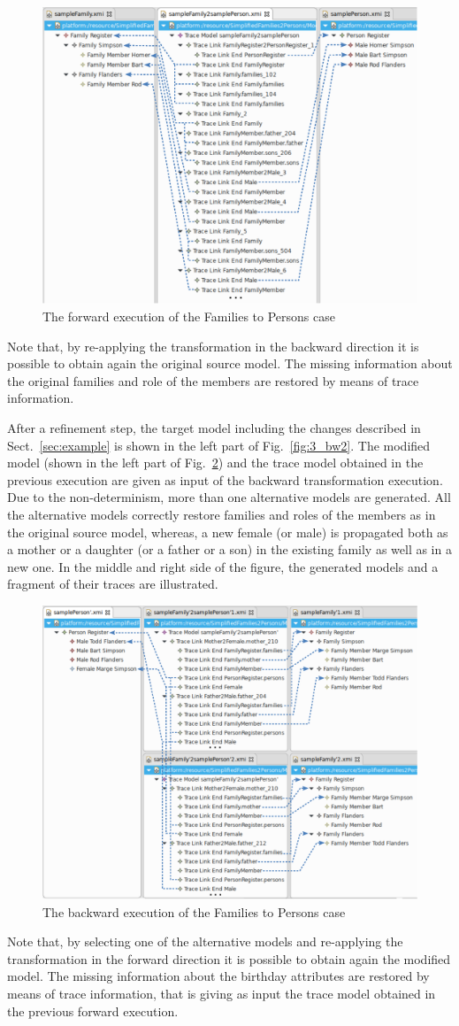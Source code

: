\begin{figure}[h]
	\center
	\includegraphics[width=.5\textwidth]{diagrams/solutions/jtl_fw}
	\caption{The forward execution of the Families to Persons case}
	\label{fig:jtl_fw}
\end{figure}


Note that, by re-applying the transformation in the backward direction it is possible to obtain again the original source model. The missing information about the original families and role of the members are restored by means of trace information.


After a refinement step, the target model including the changes described in Sect.~\ref{sec:example} is shown in the left part of Fig.~\ref{fig:3_bw2}. 
The modified model (shown in the left part of Fig.~\ref{fig:jtl_bw}) and the trace model obtained in the previous execution are given as input of the backward transformation execution.
Due to the non-determinism, more than one alternative models are generated. All the alternative models correctly restore families and roles of the members as in the original
source model, whereas, a new female (or male) is propagated both as a mother or a daughter (or a father or a son) in the existing family as well as in a new one. 
%
In the middle and right side of the figure, the generated models and a fragment of their traces are illustrated. 


\begin{figure}[h]
	\center
	\includegraphics[width=.5\textwidth]{diagrams/solutions/jtl_bw}
	\caption{The backward execution of the Families to Persons case}
	\label{fig:jtl_bw}
\end{figure}


Note that, by selecting one of the alternative models and re-applying the transformation in the forward direction it is possible to obtain again the modified model. The missing information about the birthday attributes are restored by means of trace information, that is giving as input the trace model obtained in the previous forward execution. 